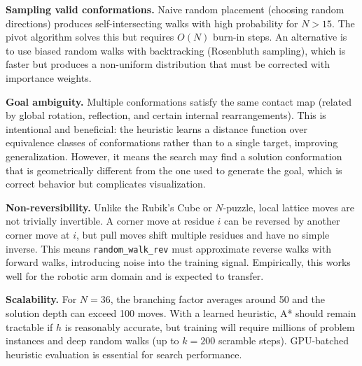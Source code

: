 \documentclass[11pt]{article}
\begin{document}
\textbf{Sampling valid conformations.} Naive random placement (choosing random directions) produces self-intersecting walks with high probability for $N > 15$. The pivot algorithm solves this but requires $O(N)$ burn-in steps. An alternative is to use biased random walks with backtracking (Rosenbluth sampling), which is faster but produces a non-uniform distribution that must be corrected with importance weights.

\textbf{Goal ambiguity.} Multiple conformations satisfy the same contact map (related by global rotation, reflection, and certain internal rearrangements). This is intentional and beneficial: the heuristic learns a distance function over equivalence classes of conformations rather than to a single target, improving generalization. However, it means the search may find a solution conformation that is geometrically different from the one used to generate the goal, which is correct behavior but complicates visualization.

\textbf{Non-reversibility.} Unlike the Rubik's Cube or $N$-puzzle, local lattice moves are not trivially invertible. A corner move at residue $i$ can be reversed by another corner move at $i$, but pull moves shift multiple residues and have no simple inverse. This means \texttt{random\_walk\_rev} must approximate reverse walks with forward walks, introducing noise into the training signal. Empirically, this works well for the robotic arm domain and is expected to transfer.

\textbf{Scalability.} For $N = 36$, the branching factor averages around 50 and the solution depth can exceed 100 moves. With a learned heuristic, A* should remain tractable if $h$ is reasonably accurate, but training will require millions of problem instances and deep random walks (up to $k = 200$ scramble steps). GPU-batched heuristic evaluation is essential for search performance.
\end{document}
